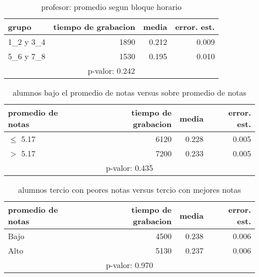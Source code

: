 \documentclass[spanish]{article}
\begin{document}
\begin{table}[h!]
\begin{center}
\begin{tabular}{|l|r|r|r|}
\hline
grupo     & tiempo de grabacion & media          & error. est.     \\ \hline
1\_2 y 3\_4 &                1890 &          0.212 &            0.009\\ \hline
5\_6 y 7\_8 &                1530 &          0.195 &            0.010\\ \hline
\multicolumn{4}{|c|}{p-valor: 0.242} \\ \hline
\end{tabular}
\caption{profesor: promedio segun bloque horario}
\end{center}
\end{table}

\begin{table}[h!]
\begin{center}
\begin{tabular}{|l|r|r|r|}
\hline
promedio de notas & tiempo de grabacion & media          & error. est.     \\ \hline
$\leq$ 5.17           &                6120 &          0.228 &            0.005\\ \hline
$>$ 5.17            &                7200 &          0.233 &            0.005\\ \hline
\multicolumn{4}{|c|}{p-valor: 0.435} \\ \hline
\end{tabular}
\caption{alumnos bajo el promedio de notas versus sobre promedio de notas}
\end{center}
\end{table}

\begin{table}[h!]
\begin{center}
\begin{tabular}{|l|r|r|r|}
\hline
promedio de notas & tiempo de grabacion & media          & error. est.     \\ \hline
Bajo              &                4500 &          0.238 &            0.006\\ \hline
Alto              &                5130 &          0.237 &            0.006\\ \hline
\multicolumn{4}{|c|}{p-valor: 0.970} \\ \hline
\end{tabular}
\caption{alumnos tercio con peores notas versus tercio con mejores notas}
\end{center}
\end{table}
\end{document}
